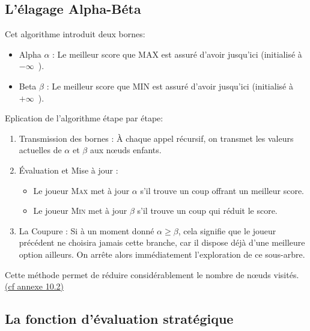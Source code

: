 \documentclass{article}
\begin{document}
\subsection{L'élagage Alpha-Béta}
Cet algorithme introduit deux bornes: 
\begin{itemize}
    \item Alpha $\alpha$ : Le meilleur score que MAX est assuré d'avoir jusqu'ici (initialisé à $-\infty$\ ).
    \item Beta $\beta$ : Le meilleur score que MIN est assuré d'avoir jusqu'ici (initialisé à $+\infty$\ ).
\end{itemize}
Eplication de l'algorithme étape par étape: 
\begin{enumerate}
\item Transmission des bornes : À chaque appel récursif, on transmet les valeurs actuelles de $\alpha$ et $\beta$ aux nœuds enfants.
\item Évaluation et Mise à jour :\begin{itemize}\item Le joueur \textsc{Max} met à jour $\alpha$ s'il trouve un coup offrant un meilleur score.
\item Le joueur \textsc{Min} met à jour $\beta$ s'il trouve un coup qui réduit le score.
\end{itemize}
\item La Coupure : Si à un moment donné $\alpha \ge \beta$, cela signifie que le joueur précédent ne choisira jamais cette branche, car il dispose déjà d'une meilleure option ailleurs. On arrête alors immédiatement l'exploration de ce sous-arbre.
\end{enumerate}
Cette méthode permet de réduire considérablement le nombre de nœuds visités. \hyperref[alg:alphabeta]{(cf annexe 10.2)}


\subsection{La fonction d'évaluation stratégique}
\end{document}
